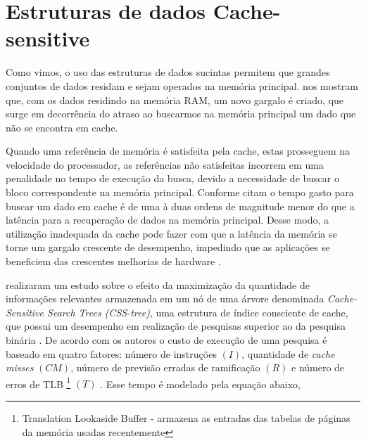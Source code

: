 



\section{Estruturas de dados Cache-sensitive}

Como vimos, o uso das estruturas de dados sucintas permitem que grandes conjuntos de dados residam e sejam operados na memória principal.  \citet{paper-effect-node-size-cache-b-trees} nos mostram que, com os  dados residindo na memória RAM, um novo gargalo é criado, que surge em decorrência do atraso ao buscarmos na memória principal um dado que não se encontra em cache. 

Quando uma referência de memória é satisfeita pela cache, estas prosseguem na velocidade do processador, as referências não satisfeitas incorrem em uma penalidade no tempo de execução da busca, devido a necessidade de buscar o bloco correspondente na memória principal. Conforme citam \citet{paper-effect-node-size-cache-b-trees} o tempo gasto para buscar um dado em cache é de uma à duas ordens de magnitude menor do que a latência para a recuperação de dados na memória principal. Desse modo, a utilização inadequada da cache pode fazer com que a latência da memória se torne um gargalo crescente de desempenho, impedindo que as aplicações se beneficiem das crescentes melhorias de hardware \citep{paper-making-btree-cache}.
 
\citet{paper-effect-node-size-cache-b-trees} realizaram um estudo sobre o efeito da maximização da quantidade de informações relevantes armazenada em um nó de uma árvore denominada \textit{Cache-Sensitive Search Trees (CSS-tree)}, uma estrutura de índice consciente de cache, que possui um desempenho em realização de pesquisas superior ao da pesquisa binária \citep{paper-making-btree-cache}. De acordo com os autores o custo de execução de uma pesquisa é baseado em quatro fatores: número de instruções $(I)$, quantidade de \textit{cache misses} $(CM)$, número de previsão  erradas de ramificação $(R)$ e número de erros de TLB \footnote{ Translation Lookaside Buffer  - armazena as entradas das tabelas de páginas da memória usadas recentemente}  $(T)$ \citep{paper-effect-node-size-cache-b-trees}.  Esse tempo é modelado pela equação abaixo,

